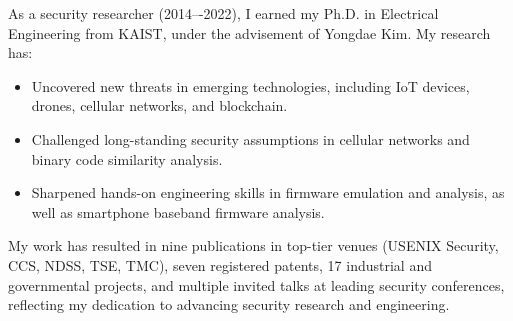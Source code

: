 As a security researcher (2014–-2022), I earned my Ph.D. in Electrical Engineering from KAIST, under the advisement of Yongdae Kim.
My research has:

\begin {itemize}
\item Uncovered new threats in emerging technologies, including IoT devices, drones, cellular networks, and blockchain.
\item Challenged long-standing security assumptions in cellular networks and binary code similarity analysis.
\item Sharpened hands-on engineering skills in firmware emulation and analysis, as well as smartphone baseband firmware analysis.
\end {itemize}

My work has resulted in nine publications in top-tier venues (USENIX Security, CCS, NDSS, TSE, TMC), seven registered patents, 17 industrial and governmental projects, and multiple invited talks at leading security conferences, reflecting my dedication to advancing security research and engineering.




